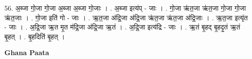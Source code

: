 \documentclass[17pt]{extarticle}
\begin{document}
56. अ॒ब्जा गो॒जा गो॒जा अ॒ब्जा अ॒ब्जा गो॒जाः । . अ॒ब्जा इत्य॑प् - जाः । . गो॒जा ऋ॑त॒जा ऋ॑त॒जा गो॒जा गो॒जा ऋ॑त॒जाः । . गो॒जा इति॑ गो - जाः । . ऋ॒त॒जा अ॑द्रि॒जा अ॑द्रि॒जा ऋ॑त॒जा ऋ॑त॒जा अ॑द्रि॒जाः । . ऋ॒त॒जा इत्यृ॑त - जाः । . अ॒द्रि॒जा ऋ॒त मृ॒त म॑द्रि॒जा अ॑द्रि॒जा ऋ॒तं । . अ॒द्रि॒जा इत्य॑द्रि - जाः । . ऋ॒तं बृ॒हद् बृ॒हदृ॒तं ऋ॒तं बृ॒हत् । . बृ॒हदिति॑ बृ॒हत् । \newline

\textbf{Ghana Paata } \newline
\end{document}
